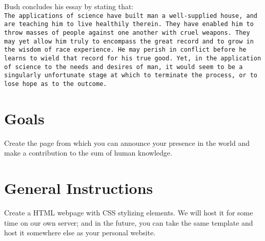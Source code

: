 \documentclass{42-en}
\begin{document}
Bush concludes his essay by stating that:\\

\texttt{The applications of science have built man a well-supplied house, and are teaching him to live healthily therein. They have enabled him to throw masses of people against one another with cruel weapons. They may yet allow him truly to encompass the great record and to grow in the wisdom of race experience. He may perish in conflict before he learns to wield that record for his true good. Yet, in the application of science to the needs and desires of man, it would seem to be a singularly unfortunate stage at which to terminate the process, or to lose hope as to the outcome.} \\

\startexercices



\chapter{Goals}

Create the page from which you can announce your presence in the world and make a contribution to the sum of human knowledge.


\chapter{General Instructions}

Create a HTML webpage with CSS stylizing elements. We will host it for some time on our own server; and in the future, you can take the same template and host it somewhere else as your personal website.
\end{document}

